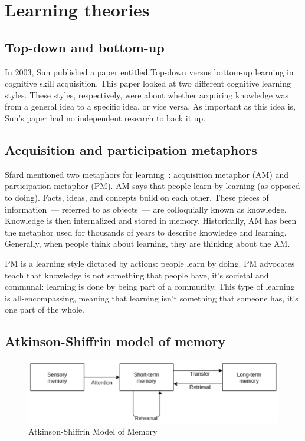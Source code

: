 \section{Learning theories}
\subsection{Top-down and bottom-up}
In 2003, Sun published a paper entitled Top-down versus bottom-up learning in cognitive skill acquisition. This paper looked at two different cognitive learning styles. These styles, respectively, were about whether acquiring knowledge was from a general idea to a specific idea, or vice versa. As important as this idea is, Sun's paper had no independent research to back it up.

\subsection{Acquisition and participation metaphors}
Sfard mentioned two metaphors for learning~\citep{sfard1998}: acquisition metaphor (AM) and participation metaphor (PM). AM says that people learn by learning (as opposed to doing). Facts, ideas, and concepts build on each other. These pieces of information~--- referred to as objects~--- are colloquially known as knowledge. Knowledge is then internalized and stored in memory. Historically, AM has been the metaphor used for thousands of years to describe knowledge and learning. Generally, when people think about learning, they are thinking about the AM.

PM is a learning style dictated by actions: people learn by doing. PM advocates teach that knowledge is not something that people have, it's societal and communal: learning is done by being part of a community. This type of learning is all-encompassing, meaning that learning isn't something that someone has, it's one part of the whole.

\subsection{Atkinson-Shiffrin model of memory}
\begin{figure}
  \centering
  \includegraphics[width=\textwidth]{figures/chapter2/atkinson-model-of-memory.png}
  \caption{Atkinson-Shiffrin Model of Memory}
  \label{fig:atkinson-model-of-memory}
\end{figure}

